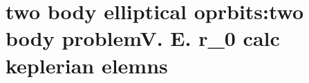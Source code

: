 \section{ two body elliptical oprbits:two body problemV. E. r_0 calc keplerian elemns  }\label{sec:q1}    
